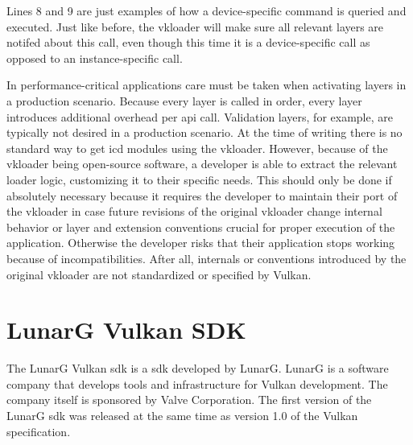     Lines 8 and 9 are just examples of how a device-specific command is queried and executed.
    Just like before, the \gls{vkloader} will make sure all relevant layers are notifed about this call, even though this time it is a device-specific call as opposed to an instance-specific call.

    In performance-critical applications care must be taken when activating layers in a production scenario.
    Because every layer is called in order, every layer introduces additional overhead per \gls{api} call.
    Validation layers, for example, are typically not desired in a production scenario.
    At the time of writing there is no standard way to get \gls{icd} modules using the \gls{vkloader}.
    However, because of the \gls{vkloader} being open-source software, a developer is able to extract the relevant loader logic, customizing it to their specific needs.
    This should only be done if absolutely necessary because it requires the developer to maintain their port of the \gls{vkloader} in case future revisions of the original \gls{vkloader} change internal behavior or layer and extension conventions crucial for proper execution of the application.
    Otherwise the developer risks that their application stops working because of incompatibilities.
    After all, internals or conventions introduced by the original \gls{vkloader} are not standardized or specified by Vulkan.






  \section{LunarG Vulkan SDK}
  \label{sec:LunarGSDK}
    The LunarG Vulkan \gls{sdk}\cite{lunargvulkansdk} is a \acrlong{sdk} developed by LunarG.
    LunarG is a software company that develops tools and infrastructure for Vulkan development.
    The company itself is sponsored by Valve Corporation.
    The first version of the LunarG \gls{sdk} was released at the same time as version 1.0 of the Vulkan specification.

